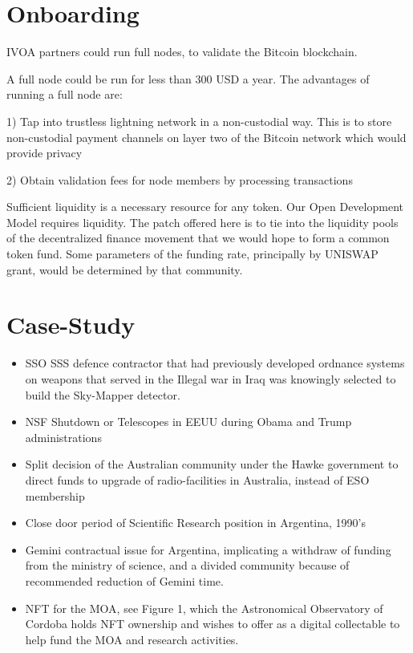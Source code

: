 \documentclass[final,5p,times,twocolumn,authoryear]{elsarticle}
\begin{document}
\section{Onboarding}
\label{sec:use-case}

IVOA partners could run full nodes, to validate the Bitcoin blockchain.

A full node could be run for less than 300 USD a year. The advantages of running a full node are:

1) Tap into trustless lightning network in a non-custodial way. This is to store non-custodial payment channels on layer two of the Bitcoin network which would provide privacy 

2) Obtain validation fees for node members by processing transactions


Sufficient liquidity is a necessary resource for any token. Our Open Development Model requires liquidity. The patch offered here is to tie into the liquidity pools of the decentralized finance movement that we would hope to form a common token fund. Some parameters of the funding rate, principally by UNISWAP grant, would be determined by that community.   

\section{Case-Study}
\label{sec:btc5}

\begin{itemize}
    \item{SSO SSS defence contractor that had previously developed ordnance systems on weapons that served in the Illegal war in Iraq was knowingly selected to build the Sky-Mapper detector. } 
    \item{NSF Shutdown or Telescopes in EEUU during Obama and Trump administrations}
    \item{Split decision of the Australian community under the Hawke government to direct funds to upgrade of radio-facilities in Australia, instead of ESO membership}
    \item{Close door period of Scientific Research position in Argentina, 1990's}
    \item{Gemini contractual issue for Argentina, implicating a withdraw of funding from the ministry of science, and a divided community because of recommended reduction of Gemini time.}
    \item{NFT for the MOA}, see Figure 1, which the Astronomical Observatory of Cordoba holds NFT ownership and wishes to offer as a digital collectable to help fund the MOA and research activities. 

\end{itemize}
\end{document}
